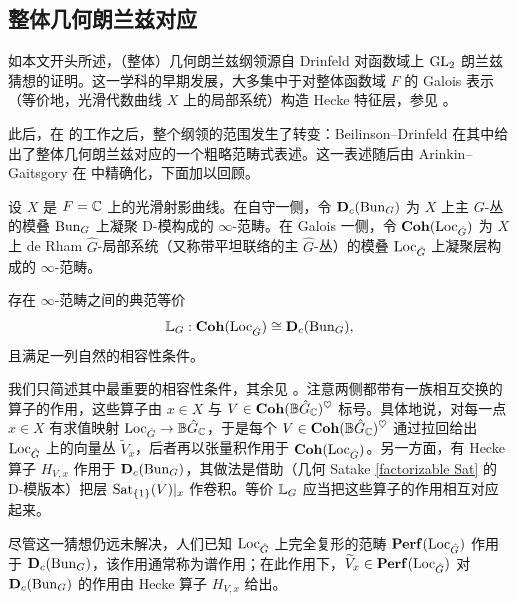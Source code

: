 
\subsection{整体几何朗兰兹对应}\label{Global GLC}

如本文开头所述，（整体）几何朗兰兹纲领源自 Drinfeld 对函数域上 ${\operatorname{GL}}_2$ 朗兰兹猜想的证明。这一学科的早期发展，大多集中于对整体函数域 $F$ 的 Galois 表示（等价地，光滑代数曲线 $X$ 上的局部系统）构造 Hecke 特征层，参见 \cite{Drinfeld-GL2, Laumon-Geometric-Langlands, FGV-Geometric-Langlands-GLn}。

此后，在 \cite{Beilinson-Drinfeld-Hitchin} 的工作之后，整个纲领的范围发生了转变：Beilinson--Drinfeld 在其中给出了整体几何朗兰兹对应的一个粗略范畴式表述。这一表述随后由 Arinkin--Gaitsgory 在 \cite{Arinkin-Gaitsgory-Singular-Support} 中精确化，下面加以回顾。

设 $X$ 是 $F={\mathbb C}$ 上的光滑射影曲线。在自守一侧，令 $\mathbf{D}_c({\operatorname{Bun}}_G)$ 为 $X$ 上主 $G$-丛的模叠 ${\operatorname{Bun}}_G$ 上凝聚 D-模构成的 $\infty$-范畴。在 Galois 一侧，令 ${\mathbf{Coh}}({\operatorname{Loc}}_{\hat{G}})$ 为 $X$ 上 de Rham $\hat{G}$-局部系统（又称带平坦联络的主 $\hat{G}$-丛）的模叠 ${\operatorname{Loc}}_{\hat{G}}$ 上凝聚层构成的 $\infty$-范畴。

\begin{conj}\label{Conj: GGLC}
存在 $\infty$-范畴之间的典范等价
\[
{\mathbb L}_G:  {\mathbf{Coh}}({\operatorname{Loc}}_{\hat{G}})\cong \mathbf{D}_c({\operatorname{Bun}}_G),
\]
且满足一列自然的相容性条件。
\end{conj}

我们只简述其中最重要的相容性条件，其余见 \cite{Arinkin-Gaitsgory-Singular-Support}。注意两侧都带有一族相互交换的算子的作用，这些算子由 $x\in X$ 与 $V\in {\mathbf{Coh}}({\mathbb B}\hat{G}_{\mathbb C})^\heartsuit$ 标号。具体地说，对每一点 $x\in X$ 有求值映射 ${\operatorname{Loc}}_{\hat{G}}\to {\mathbb B}\hat{G}_{\mathbb C}$，于是每个 $V\in {\mathbf{Coh}}({\mathbb B}\hat{G}_{\mathbb C})^\heartsuit$ 通过拉回给出 ${\operatorname{Loc}}_{\hat{G}}$ 上的向量丛 $\widetilde{V}_x$，后者再以张量积作用于 ${\mathbf{Coh}}({\operatorname{Loc}}_{\hat{G}})$。另一方面，有 Hecke 算子 $H_{V,x}$ 作用于 $\mathbf{D}_c({\operatorname{Bun}}_G)$，其做法是借助（几何 Satake \eqref{factorizable Sat} 的 D-模版本）把层 ${\operatorname{Sat}}_{\{1\}}(V)|_x$ 作卷积。等价 ${\mathbb L}_G$ 应当把这些算子的作用相互对应起来。

尽管这一猜想仍远未解决，人们已知 ${\operatorname{Loc}}_{\hat{G}}$ 上完全复形的范畴 ${\mathbf{Perf}}({\operatorname{Loc}}_{\hat{G}})$ 作用于 $\mathbf{D}_c({\operatorname{Bun}}_G)$，该作用通常称为谱作用；在此作用下，$\widetilde{V}_x\in {\mathbf{Perf}}({\operatorname{Loc}}_{\hat{G}})$ 对 $\mathbf{D}_c({\operatorname{Bun}}_G)$ 的作用由 Hecke 算子 $H_{V,x}$ 给出。

